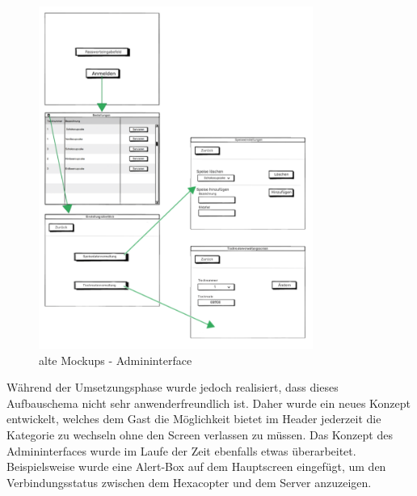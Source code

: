 			\begin{figure}[H]
			\begin{centering}
			\includegraphics[width = 0.8\textwidth]{Bilder/Jok_alte_mockups_admin}
			\par\end{centering}
			\caption{alte Mockups - Admininterface}
			\label{alte Mockups}
			\end{figure}Während der Umsetzungsphase wurde jedoch realisiert, dass dieses Aufbauschema nicht sehr anwenderfreundlich ist. Daher wurde ein neues Konzept entwickelt, welches dem Gast die Möglichkeit bietet im Header jederzeit die Kategorie zu wechseln ohne den Screen verlassen zu müssen. Das Konzept des Admininterfaces wurde im Laufe der Zeit ebenfalls etwas überarbeitet. Beispielsweise wurde eine Alert-Box auf dem Hauptscreen eingefügt, um den Verbindungsstatus zwischen dem Hexacopter und dem Server anzuzeigen. \\

\pagebreak

